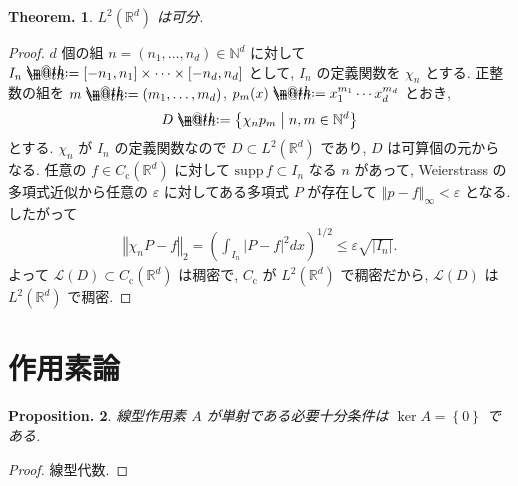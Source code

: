 \documentclass[openany, a4paper, oneside]{jsbook}
\makeatletter
\newcommand*{\defeq}{\mathrel{\rlap{%
\raisebox{0.3ex}{$\m@th\cdot$}}%
\raisebox{-0.3ex}{$\m@th\cdot$}}%
=}
\theoremstyle{break}
\theoremstyle{breakdefn}
\newtheorem{thm}{Theorem.}[section]
\newtheorem{prop}[thm]{Proposition.}
\newcommand{\abs}[1]{\left|#1\right|}
\newcommand{\norm}[1]{\left\Vert#1\right\Vert}
\newcommand{\rbk}[1]{\left (#1\right)}
\newcommand{\cbk}[1]{\left\{#1\right\}}
\newcommand{\relmiddle}[1]{\mathrel{}\middle#1\mathrel{}}
\newcommand{\set}[2]{\left\{#1 \relmiddle| #2\right\}}
\newcommand{\bbN}{\mathbb{N}}
\newcommand{\bbRd}{\mathbb{R}^d}
\newcommand{\calL}{\mathcal{L}}
\newcommand{\supp}{\mathrm{supp} \,}
\makeatother
\begin{document}
\begin{thm}
 $L^2 (\bbRd)$ は可分.
\end{thm}
\begin{proof}
$d$ 個の組 $n = (n_{1}, \dots, n_{d}) \in \bbN^d$ に対して
$I_{n} \defeq [-n_{1}, n_{1}] \times \cdots \times[-n_{d}, n_{d}]$
として, $I_{n}$ の定義関数を $\chi_{n}$ とする.
正整数の組を $m \defeq  (m_1, \dots, m_d)$, $p_m (x) \defeq x_1^{m_1} \cdots x_d^{m_d}$ とおき,
\begin{align}
 D
 \defeq
 \set{\chi_n p_m}{n, m \in \bbN^d}
\end{align}
とする.
$\chi_{n}$ が $I_{n}$ の定義関数なので $D \subset L^2 (\bbRd)$ であり, $D$ は可算個の元からなる.
任意の $f \in C_{\mathrm{c}}(\bbRd)$ に対して $\supp f \subset I_{n}$ なる $n$ があって,
Weierstrass の多項式近似から任意の $\varepsilon$ に対してある多項式 $P$ が存在して
$\norm{p - f}_{\infty} < \varepsilon$ となる.
したがって
\begin{align}
 \norm{\chi_n P -f}_{2}
 =
 \rbk{\int_{I_n} \abs{P - f}^2 dx}^{1/2}
 \leq
 \varepsilon \sqrt{\abs{I_n}}.
\end{align}
よって $\calL (D)\subset C_{\mathrm{c}}(\bbRd)$ は稠密で,
$C_{\mathrm{c}}$ が $L^2 (\bbRd)$ で稠密だから, $\calL (D)$ は $L^2 (\bbRd)$ で稠密.
\end{proof}
\section{作用素論}


\begin{prop}
 線型作用素 $A$ が単射である必要十分条件は $\ker A = \cbk{0}$ である.
\end{prop}
\begin{proof}
線型代数.
\end{proof}
\end{document}
